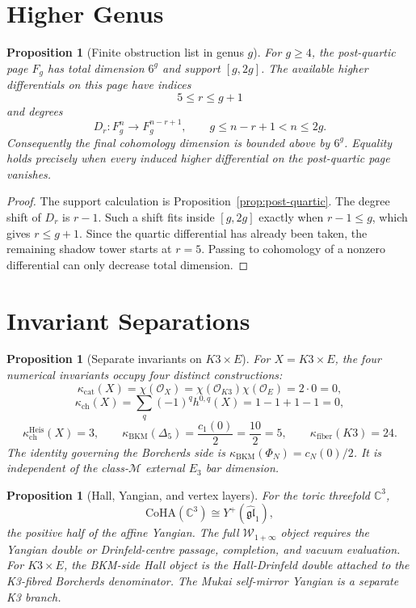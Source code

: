 \documentclass[11pt]{article}
\theoremstyle{plain}
\newtheorem{proposition}[theorem]{Proposition}
\theoremstyle{definition}
\theoremstyle{remark}
\newcommand{\C}{\mathbb{C}}
\newcommand{\CoHA}{\mathrm{CoHA}}
\newcommand{\kch}{\kappa_{\mathrm{ch}}}
\newcommand{\kcat}{\kappa_{\mathrm{cat}}}
\newcommand{\kBKM}{\kappa_{\mathrm{BKM}}}
\newcommand{\kfib}{\kappa_{\mathrm{fiber}}}
\newcommand{\Winf}{\mathcal{W}_{1+\infty}}
\newcommand{\fgl}{\mathfrak{gl}}
\begin{document}
\section{Higher Genus}
\label{sec:higher-genus}

\begin{proposition}[Finite obstruction list in genus $g$]
\label{prop:higher-genus-obstructions}
For $g\geq 4$, the post-quartic page $F_g$ has total dimension $6^g$ and
support $[g,2g]$. The available higher differentials on this page have
indices
\[
 5\leq r\leq g+1
\]
and degrees
\[
 D_r:F_g^n\longrightarrow F_g^{n-r+1},
 \qquad
 g\leq n-r+1<n\leq 2g.
\]
Consequently the final cohomology dimension is bounded above by $6^g$.
Equality holds precisely when every induced higher differential on the
post-quartic page vanishes.
\end{proposition}

\begin{proof}
The support calculation is Proposition~\ref{prop:post-quartic}. The degree
shift of $D_r$ is $r-1$. Such a shift fits inside $[g,2g]$ exactly when
$r-1\leq g$, which gives $r\leq g+1$. Since the quartic differential has
already been taken, the remaining shadow tower starts at $r=5$. Passing to
cohomology of a nonzero differential can only decrease total dimension.
\end{proof}

\section{Invariant Separations}
\label{sec:invariant-separations}

\begin{proposition}[Separate invariants on $K3\times E$]
\label{prop:k3e-separations}
For $X=K3\times E$, the four numerical invariants occupy four distinct
constructions:
\[
 \kcat(X)=\chi(\mathcal{O}_X)=
 \chi(\mathcal{O}_{K3})\chi(\mathcal{O}_E)=2\cdot 0=0,
\]
\[
 \kch(X)=\sum_q(-1)^qh^{0,q}(X)=1-1+1-1=0,
\]
\[
 \kch^{\mathrm{Heis}}(X)=3,\qquad
 \kBKM(\Delta_5)=\frac{c_1(0)}{2}=\frac{10}{2}=5,\qquad
 \kfib(K3)=24.
\]
The identity governing the Borcherds side is $\kBKM(\Phi_N)=c_N(0)/2$.
It is independent of the class-$\mathcal{M}$ external $E_3$ bar dimension.
\end{proposition}

\begin{proposition}[Hall, Yangian, and vertex layers]
\label{prop:hall-yangian-vertex-layers}
For the toric threefold $\C^3$,
\[
 \CoHA(\C^3)\cong Y^+(\widehat{\fgl}_1),
\]
the positive half of the affine Yangian. The full $\Winf$ object requires
the Yangian double or Drinfeld-centre passage, completion, and vacuum
evaluation. For $K3\times E$, the BKM-side Hall object is the
Hall-Drinfeld double attached to the K3-fibred Borcherds denominator. The
Mukai self-mirror Yangian is a separate K3 branch.
\end{proposition}
\end{document}
